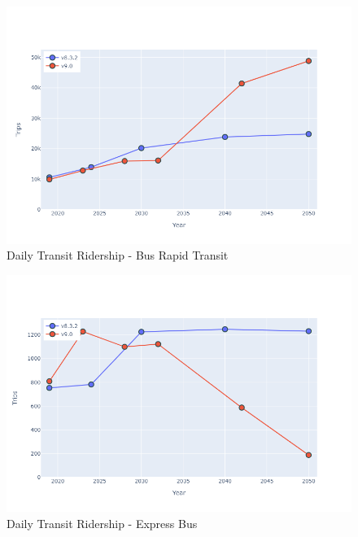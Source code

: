 \documentclass[
  letterpaper,
  DIV=11,
  numbers=noendperiod]{scrreprt}
\begin{document}
\begin{figure}[H]

{\centering \includegraphics{v9x/v900/whats-new/_pictures/pdf-hy-tr-brt.png}

}

\caption{\label{fig-pdf-hy-tr-brt}Daily Transit Ridership - Bus Rapid
Transit}

\end{figure}

\begin{figure}[H]

{\centering \includegraphics{v9x/v900/whats-new/_pictures/pdf-hy-tr-exp.png}

}

\caption{\label{fig-pdf-hy-tr-exp}Daily Transit Ridership - Express Bus}

\end{figure}
\end{document}
